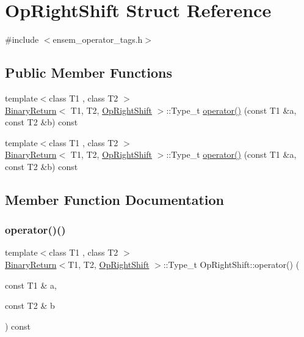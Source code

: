 \hypertarget{structOpRightShift}{}\section{Op\+Right\+Shift Struct Reference}
\label{structOpRightShift}


{\ttfamily \#include $<$ensem\+\_\+operator\+\_\+tags.\+h$>$}

\subsection*{Public Member Functions}
\begin{DoxyCompactItemize}
\item 
{\footnotesize template$<$class T1 , class T2 $>$ }\\\mbox{\hyperlink{structBinaryReturn}{Binary\+Return}}$<$ T1, T2, \mbox{\hyperlink{structOpRightShift}{Op\+Right\+Shift}} $>$\+::Type\+\_\+t \mbox{\hyperlink{structOpRightShift_a8b6b10211df9e2bcb0e8ce90458f12b8}{operator()}} (const T1 \&a, const T2 \&b) const
\item 
{\footnotesize template$<$class T1 , class T2 $>$ }\\\mbox{\hyperlink{structBinaryReturn}{Binary\+Return}}$<$ T1, T2, \mbox{\hyperlink{structOpRightShift}{Op\+Right\+Shift}} $>$\+::Type\+\_\+t \mbox{\hyperlink{structOpRightShift_a8b6b10211df9e2bcb0e8ce90458f12b8}{operator()}} (const T1 \&a, const T2 \&b) const
\end{DoxyCompactItemize}


\subsection{Member Function Documentation}
\mbox{\label{structOpRightShift_a8b6b10211df9e2bcb0e8ce90458f12b8}} 
\subsubsection{\texorpdfstring{operator()()}{operator()()}\hspace{0.1cm}{\footnotesize\ttfamily [1/2]}}
{\footnotesize\ttfamily template$<$class T1 , class T2 $>$ \\
\mbox{\hyperlink{structBinaryReturn}{Binary\+Return}}$<$T1, T2, \mbox{\hyperlink{structOpRightShift}{Op\+Right\+Shift}} $>$\+::Type\+\_\+t Op\+Right\+Shift\+::operator() (\begin{DoxyParamCaption}\item[{const T1 \&}]{a,  }\item[{const T2 \&}]{b }\end{DoxyParamCaption}) const\hspace{0.3cm}{\ttfamily [inline]}}

